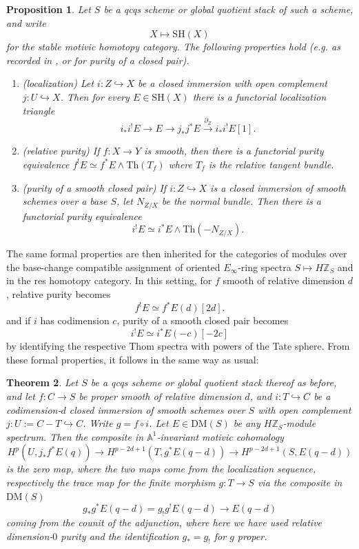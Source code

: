\documentclass[a4paper,reqno,11pt]{amsart}
\theoremstyle{plain}
\newtheorem{theorem}{Theorem}[section]
\newtheorem{proposition}[theorem]{Proposition}
\theoremstyle{definition}
\theoremstyle{remark}
\newcommand{\Z}{\mathbb{Z}}
\newcommand{\A}{\mathbb{A}}
\newcommand{\DM}{\mathrm{DM}}
\newcommand{\SH}{\mathrm{SH}}
\begin{document}
\begin{proposition}
Let $S$ be a qcqs scheme or global quotient stack of such a scheme, and write
\[
X\longmapsto \SH(X)
\]
for the stable motivic homotopy category. The following properties hold (e.g. as recorded in \cite[Theorem 6.18]{Hoy}, or \cite[Theorem 3.2.23]{MV} for purity of a closed pair).

\begin{enumerate}
    \item \textup{(localization)}
    Let $i:Z\hookrightarrow X$ be a closed immersion with open complement $j:U\hookrightarrow X$. Then for every $E\in \SH(X)$ there is a functorial localization triangle
    \[
    i_*i^!E\longrightarrow E\longrightarrow j_*j^*E
    \xrightarrow{\partial_Z}
    i_*i^!E[1].
    \]
    \item \textup{(relative purity)}
    If $f:X\to Y$ is smooth, then there is a functorial purity equivalence $f^!E\simeq f^*E\wedge \mathrm{Th}(T_f)$ where $T_f$ is the relative tangent bundle.

    \item \textup{(purity of a smooth closed pair)}
    If $i:Z\hookrightarrow X$ is a closed immersion of smooth schemes over a base $S$, let $N_{Z/X}$ be the normal bundle. Then there is a functorial purity equivalence
    \[
    i^!E\simeq i^*E\wedge \mathrm{Th}(-N_{Z/X}).
    \]
    \end{enumerate}
\end{proposition}
The same formal properties are then inherited for the categories of modules over the base-change compatible assignment of oriented $E_\infty$-ring spectra $S\mapsto H\Z_S$ and in the res homotopy category. In this setting, for $f$ smooth of relative dimension $d$, relative purity becomes
    \[
    f^!E\simeq f^*E(d)[2d].
    \]
and if $i$ has codimension $c$, purity of a smooth closed pair becomes
    \[
    i^!E\simeq i^*E(-c)[-2c]
    \]
by identifying the respective Thom spectra with powers of the Tate sphere. From these formal properties, it follows in the same way as usual:
\begin{theorem}\label{thm:main}
    Let $S$ be a qcqs scheme or global quotient stack thereof as before, and let $f:C\to S$ be proper smooth of relative dimension $d$, and $i:T\hookrightarrow C$ be a codimension-$d$ closed immersion of smooth schemes over $S$ with open complement $j:U:=C-T\hookrightarrow C$. Write $g= f\circ i$. Let $E\in \DM(S)$ be any $H\Z_S$-module spectrum. Then the composite in $\A^1$-invariant motivic cohomology
    \[
    H^p(U,j_*f^*E(q))\to H^{p-2d+1}(T,g^*E(q-d))\to  H^{p-2d+1}(S,E(q-d))
    \]
    is the zero map, where the two maps come from the localization sequence, respectively the trace map for the finite morphism $g:T\to S$ via the composite in $\DM(S)$
    \[
     g_*g^* E(q-d)=g_!g^!E(q-d) \to E(q-d)
    \]
    coming from the counit of the adjunction, where here we have used relative dimension-$0$ purity and the identification $g_*=g_!$ for $g$ proper.
\end{theorem}
\end{document}
